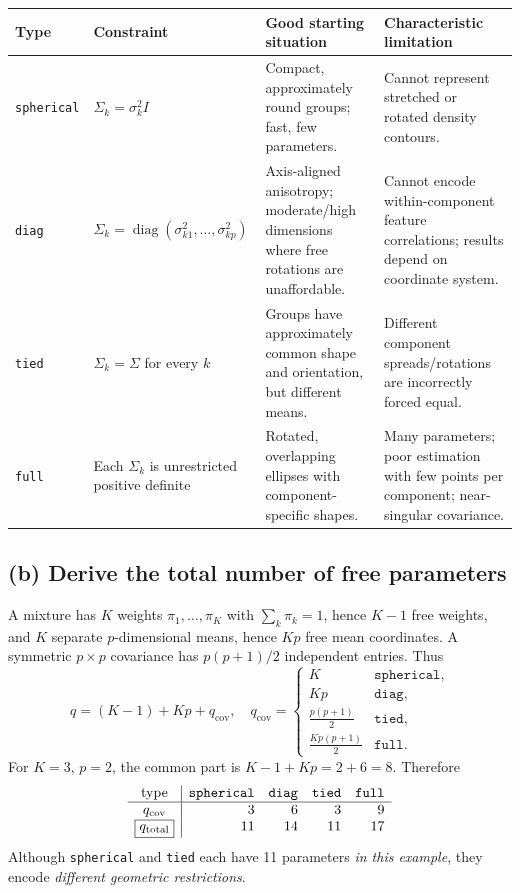 \begin{center}\small
\renewcommand{\arraystretch}{1.2}
\begin{tabularx}{\textwidth}{@{}p{1.8cm}p{3.7cm}X X@{}}\toprule
Type & Constraint & Good starting situation & Characteristic limitation\\\midrule
\texttt{spherical} & $\Sigma_k=\sigma_k^2 I$ & Compact, approximately round groups; fast, few parameters. & Cannot represent stretched or rotated density contours.\\
\texttt{diag} & $\Sigma_k=\operatorname{diag}(\sigma_{k1}^2,\ldots,\sigma_{kp}^2)$ & Axis-aligned anisotropy; moderate/high dimensions where free rotations are unaffordable. & Cannot encode within-component feature correlations; results depend on coordinate system.\\
\texttt{tied} & $\Sigma_k=\Sigma$ for every $k$ & Groups have approximately common shape and orientation, but different means. & Different component spreads/rotations are incorrectly forced equal.\\
\texttt{full} & Each $\Sigma_k$ is unrestricted positive definite & Rotated, overlapping ellipses with component-specific shapes. & Many parameters; poor estimation with few points per component; near-singular covariance.\\\bottomrule
\end{tabularx}
\end{center}

\subsection*{(b) Derive the total number of free parameters}
A mixture has $K$ weights $\pi_1,\ldots,\pi_K$ with $\sum_k\pi_k=1$, hence $\boxed{K-1}$ free weights, and $K$ separate $p$-dimensional means, hence $\boxed{Kp}$ free mean coordinates. A symmetric $p\times p$ covariance has $p(p+1)/2$ independent entries. Thus
\[
\boxed{q=(K-1)+Kp+q_{\mathrm{cov}}},\quad
q_{\mathrm{cov}}=\begin{cases}
K&\texttt{spherical},\\
Kp&\texttt{diag},\\
\tfrac{p(p+1)}{2}&\texttt{tied},\\
\tfrac{Kp(p+1)}{2}&\texttt{full}.
\end{cases}
\]
For $K=3$, $p=2$, the common part is $K-1+Kp=2+6=8$. Therefore
\[
\begin{array}{c|rrrr}
\text{type}&\texttt{spherical}&\texttt{diag}&\texttt{tied}&\texttt{full}\\\hline
q_{\rm cov}&3&6&3&9\\
\boxed{q_{\rm total}}&11&14&11&17
\end{array}
\]
Although \texttt{spherical} and \texttt{tied} each have 11 parameters \emph{in this example}, they encode \emph{different geometric restrictions}.

